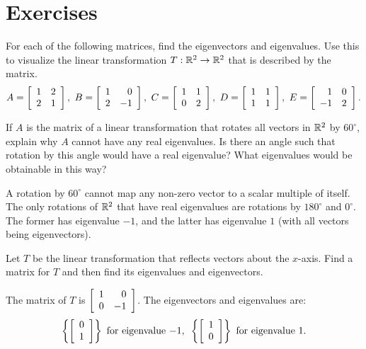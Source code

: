 \documentclass{ximera}
\author{Zack Reed}
\begin{document}
\section*{Exercises}

\begin{exercise}
  For each of the following matrices, find the eigenvectors and
  eigenvalues. Use this to visualize the linear transformation
  $T:\R^2\to\R^2$ that is described by the matrix.
  \begin{equation*}
    A = \startmat{rr}
      1 & 2 \\
      2 & 1 \\
    \stopmat,
    \quad
    B = \startmat{rr}
      1 & 0 \\
      2 & -1 \\
    \stopmat,
    \quad
    C = \startmat{rr}
      1 & 1 \\
      0 & 2 \\
    \stopmat,
    \quad
    D = \startmat{rr}
      1 & 1 \\
      1 & 1 \\
    \stopmat,
    \quad
    E = \startmat{rr}
      1 & 0 \\
      -1 & 2 \\
    \stopmat.
  \end{equation*}
\end{exercise}

\begin{exercise}
  If $A$ is the matrix of a linear transformation that rotates all
  vectors in $\R^2$ by $60^{\circ}$, explain why $A$ cannot have any
  real eigenvalues. Is there an angle such that rotation by this
  angle would have a real eigenvalue? What eigenvalues would be
  obtainable in this way?
  \begin{solution}
    A rotation by $60^{\circ}$ cannot map any non-zero vector to a
    scalar multiple of itself. The only rotations of $\R^2$ that have
    real eigenvalues are rotations by $180^{\circ}$ and $0^{\circ}$.
    The former has eigenvalue $-1$, and the latter has eigenvalue $1$
    (with all vectors being eigenvectors).
  \end{solution}
\end{exercise}

\begin{exercise}
  Let $T$ be the linear transformation that reflects vectors about
  the $x$-axis. Find a matrix for $T$ and then find its eigenvalues and
  eigenvectors.
  \begin{solution}
    The matrix of $T$ is $\startmat{rr}
      1 & 0 \\
      0 & -1
    \stopmat$. The eigenvectors and eigenvalues are:
    \begin{equation*}
      \set{\startmat{c}
          0 \\
          1
        \stopmat} ~\mbox{for eigenvalue}~ {-1},
      \quad\set{\startmat{c}
          1 \\
          0
        \stopmat} ~\mbox{for eigenvalue}~ {1}.
    \end{equation*}
  \end{solution}
\end{exercise}
\end{document}
